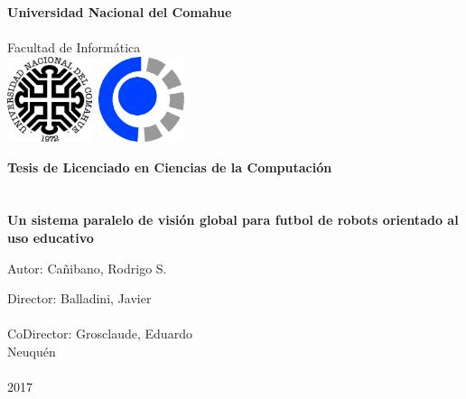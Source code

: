 
\titlepage

\begin{center}
\ \\
\ \\
\vspace{-1cm}


\ \\

\vspace{0.5cm}
{\Large{\bf \sc Universidad Nacional del Comahue}}\\

\ \\
{\Large { \sc Facultad de Informática}}\\

\vspace{-2.5cm}
\mbox{\hspace{-1cm}\includegraphics[width=2.5cm,height=2.5cm]{logos/unc.png}\hspace{13cm} \includegraphics[width=2.5cm,height=2.5cm]{logos/fai.png}}


\vspace{6cm}

{\Large {\bf\sc Tesis de Licenciado en Ciencias de la Computación}}\\
\ \\
\ \\
{\LARGE {\bf Un sistema paralelo de visión global para futbol de robots
	orientado al uso educativo}}\\
\vspace{3cm}

{\Large Autor: Cañibano, Rodrigo S.}\\
\vspace{2cm}

{\Large Director: Balladini, Javier}\\
\ \\
{\Large CoDirector: Grosclaude, Eduardo}\\

\vfill
{\Large {\sc Neuquén}\hspace{6cm}{\sc Argentina}}\\
\ \\

{\Large 2017}\\

\end{center}

\pagebreak

